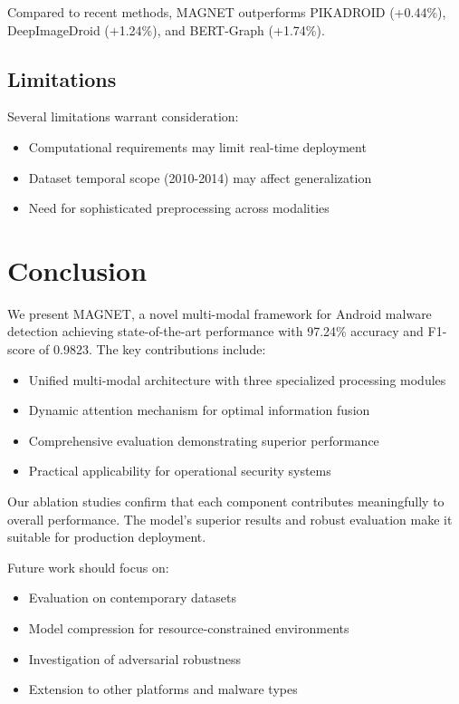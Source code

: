 \documentclass[a4paper,11pt]{article}
\begin{document}
Compared to recent methods, MAGNET outperforms PIKADROID (+0.44\%), DeepImageDroid (+1.24\%), and BERT-Graph (+1.74\%).

\subsection{Limitations}
Several limitations warrant consideration:
\begin{itemize}
    \item Computational requirements may limit real-time deployment
    \item Dataset temporal scope (2010-2014) may affect generalization
    \item Need for sophisticated preprocessing across modalities
\end{itemize}

\section{Conclusion}
We present MAGNET, a novel multi-modal framework for Android malware detection achieving state-of-the-art performance with 97.24\% accuracy and F1-score of 0.9823. The key contributions include:

\begin{itemize}
    \item Unified multi-modal architecture with three specialized processing modules
    \item Dynamic attention mechanism for optimal information fusion
    \item Comprehensive evaluation demonstrating superior performance
    \item Practical applicability for operational security systems
\end{itemize}

Our ablation studies confirm that each component contributes meaningfully to overall performance. The model's superior results and robust evaluation make it suitable for production deployment.

Future work should focus on:
\begin{itemize}
    \item Evaluation on contemporary datasets
    \item Model compression for resource-constrained environments
    \item Investigation of adversarial robustness
    \item Extension to other platforms and malware types
\end{itemize}

\onecolumn
\newpage
\printbibliography[heading=bibintoc,title={References}]
\end{document}
